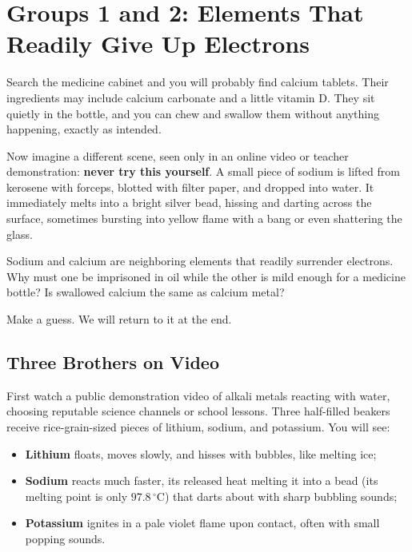 \chapter{Groups 1 and 2: Elements That Readily Give Up Electrons}

\begin{kaichang}
Search the medicine cabinet and you will probably find calcium tablets. Their ingredients may include calcium carbonate and a little vitamin D. They sit quietly in the bottle, and you can chew and swallow them without anything happening, exactly as intended.

Now imagine a different scene, seen only in an online video or teacher demonstration: \textbf{never try this yourself}. A small piece of sodium is lifted from kerosene with forceps, blotted with filter paper, and dropped into water. It immediately melts into a bright silver bead, hissing and darting across the surface, sometimes bursting into yellow flame with a bang or even shattering the glass.

Sodium and calcium are neighboring elements that readily surrender electrons. Why must one be imprisoned in oil while the other is mild enough for a medicine bottle? Is swallowed calcium the same as calcium metal?

Make a guess. We will return to it at the end.
\end{kaichang}

\section{Three Brothers on Video}

First watch a public demonstration video of alkali metals reacting with water, choosing reputable science channels or school lessons. Three half-filled beakers receive rice-grain-sized pieces of lithium, sodium, and potassium. You will see:

\begin{itemize}[itemsep=2pt]
\item \textbf{Lithium} floats, moves slowly, and hisses with bubbles, like melting ice;
\item \textbf{Sodium} reacts much faster, its released heat melting it into a bead (its melting point is only $97.8\,^{\circ}\mathrm{C}$) that darts about with sharp bubbling sounds;
\item \textbf{Potassium} ignites in a pale violet flame upon contact, often with small popping sounds.
\end{itemize}

